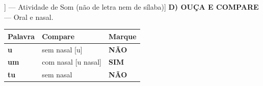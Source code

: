 \begin{exercicio}[Som /u/ nasal [[u~]] --- Atividade de Som (não de letra nem de sílaba)]
\textbf{D) OUÇA E COMPARE} --- Oral e nasal.

\begin{center}
\begin{tabular}{@{}p{4.2cm}p{6.2cm}p{1.6cm}@{}}
\hline
\textbf{Palavra} & \textbf{Compare} & \textbf{Marque} \\
\hline
\textbf{u} & sem nasal [u] & \textbf{NÃO} \\
\textbf{um} & com nasal [u nasal] & \textbf{SIM} \\
\textbf{tu} & sem nasal & \textbf{NÃO} \\
\hline
\end{tabular}
\end{center}

\end{exercicio}

